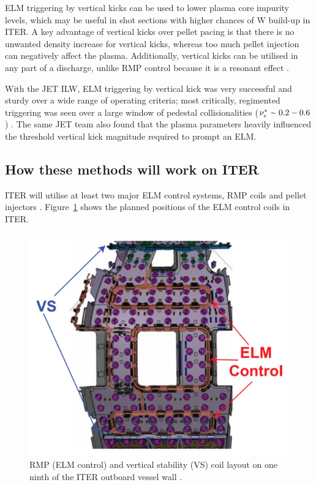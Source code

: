 \documentclass[11pt, twocolumn]{article}  %
\providecommand{\squiggle}{\raise.17ex\hbox{$\scriptstyle\sim$}} %
\begin{document}
ELM triggering by vertical kicks can be used to lower plasma core impurity levels, which may be useful in shot sections with higher chances of W build-up in ITER. A key advantage of vertical kicks over pellet pacing is that there is no unwanted density increase for vertical kicks, whereas too much pellet injection can negatively affect the plasma. Additionally, vertical kicks can be utilised in any part of a discharge, unlike RMP control because it is a resonant effect \cite{DelaLuna2016}.

With the JET ILW, ELM triggering by vertical kick was very successful and sturdy over a wide range of operating criteria; most critically, regimented triggering was seen over a large window of pedestal collisionalities ($\nu^*_e~\squiggle~0.2-0.6$) \cite{DelaLuna2016}. The same JET team also found that the plasma parameters heavily influenced the threshold vertical kick magnitude required to prompt an ELM. 

\subsection{How these methods will work on ITER}\label{ssec:onITER}
ITER will utilise at least two major ELM control systems, RMP coils and pellet injectors \cite{Loarte2010}. Figure~\ref{fig:ITERcoils} shows the planned positions of the ELM control coils in ITER.

\begin{figure}
\includegraphics[scale=0.5]{Figures/ITERcoils.PNG}
\centering
\caption{RMP (ELM control) and vertical stability (VS) coil layout on one ninth of the ITER outboard vessel wall \cite{Lang2013}.}\label{fig:ITERcoils}
\end{figure}
\end{document}
